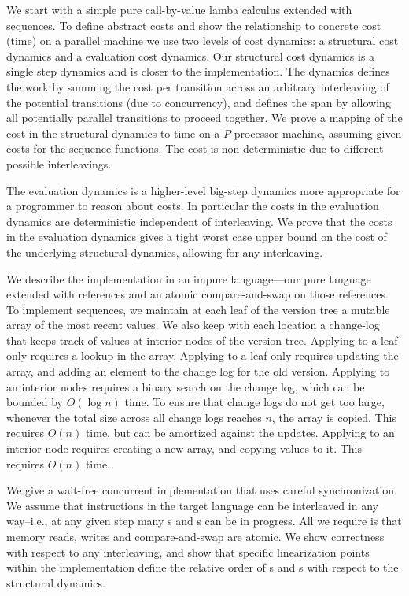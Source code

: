 We start with a simple pure call-by-value lamba calculus extended with
sequences.  To define abstract costs and show the relationship to
concrete cost (time) on a parallel machine we use two levels of cost
dynamics: a structural cost dynamics and a evaluation cost dynamics.
Our structural cost dynamics is a single step dynamics and is closer
to the implementation.   The dynamics defines the work by summing the
cost per transition across an arbitrary interleaving of the potential transitions
(due to concurrency), and defines the span by allowing all potentially
parallel transitions to proceed together.    We prove a mapping of the
cost in the structural dynamics to time on a $P$ processor machine,
assuming given costs for the sequence functions.   The cost is
non-deterministic due to different possible interleavings.

The evaluation dynamics is a higher-level big-step dynamics more
appropriate for a programmer to reason about costs.  In particular the
costs in the evaluation dynamics are deterministic independent of
interleaving.  We prove that the costs in the evaluation dynamics
gives a tight worst case upper bound on the cost of the underlying structural
dynamics, allowing for any interleaving.

We describe the implementation in an impure language---our pure
language extended with references and an atomic compare-and-swap on
those references.  To implement sequences, we maintain at
each leaf of the version tree a mutable array of the most recent values.  We
also keep with each location a change-log that keeps track of values
at interior nodes of the version tree.  Applying \get{} to a leaf only
requires a lookup in the array.  Applying \set{} to a leaf only
requires updating the array, and adding an element to the change log
for the old version.  Applying \get{} to an interior nodes requires a
binary search on the change log, which can be bounded by $O(\log n)$
time.  To ensure that change logs do not get too large, whenever the
total size across all change logs reaches $n$, the array is copied.
This requires $O(n)$ time, but can be amortized against the updates.
Applying \set{} to an interior node requires creating a new array, and
copying values to it.  This requires $O(n)$ time.

We give a wait-free concurrent implementation that uses careful
synchronization.   We assume that instructions in the target language
can be interleaved in any way--i.e., at any given step many \get{}s and
\set{}s can be in progress.   All we require is that memory reads,
writes and compare-and-swap are atomic.  We show correctness with
respect to any interleaving, and show that specific linearization
points within the implementation define the relative order of \get{}s
and \set{}s with respect to the structural dynamics.

